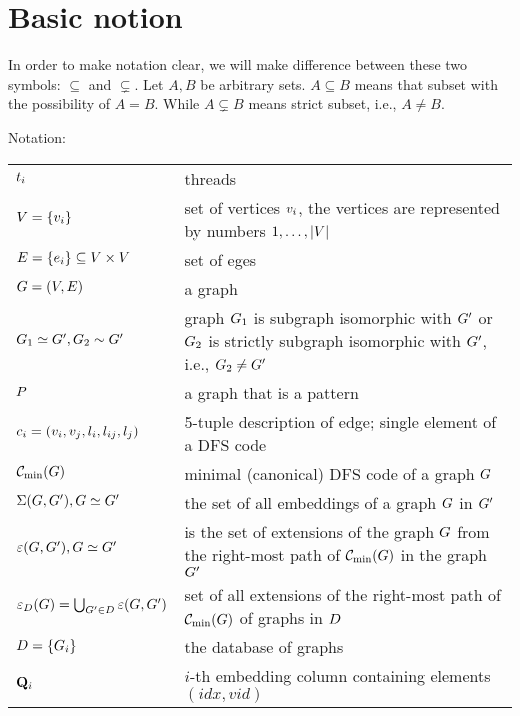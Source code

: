 \section{Basic notion}
In order to make notation clear, we will make difference between these
two symbols: $\subseteq$ and $\subsetneq$. Let $A,B$ be arbitrary
sets. $A\subseteq B$ means that subset with the possibility of $A=B$.
While $A\subsetneq B$ means strict subset, i.e., $A\neq B$.

\bigskip

\noindent Notation:\par
\begin{tabular}{lp{13cm}}
$t_i$                     &  threads                  \\ 
$V=\{v_i\}$                     & set of vertices $v_i$, the vertices are represented by numbers $1, \ldots, |V|$  \\
$E=\{e_i\}\subseteq V\times V$          & set of eges     \\
$G=(V, E)$                       & a graph                   \\
$G_1\simeq G', G_2\sim G'$               & graph $G_1$ is subgraph isomorphic with $G'$ or $G_2$ is strictly subgraph isomorphic with $G'$, i.e., $G_2\neq G'$  \\
$P$                       & a graph that is a pattern \\
$c_i=(v_i, v_j, l_i, l_{ij}, l_j)$  &  5-tuple description of edge; single element of a DFS code \\
$\mindfscode(\G)$                       & minimal (canonical) DFS code of a graph $G$ \\
$\Sigma(G,G'), G\simeq G'$    & the set of all embeddings of a graph $G$ in $G'$ \\
$\varepsilon(G,G'), G\simeq G'$     & is the set of extensions of the graph $G$ from the right-most path of $\mindfscode(\G)$ in the graph $G'$\\
$\varepsilon_{D}(G)=\bigcup_{G'\in D}\varepsilon(G, G')$       & set of all extensions of the right-most path of $\mindfscode(\G)$ of graphs in $D$ \\
$D=\{G_i\}$           & the database of graphs \\
$\mathbf{Q}_i$            & $i$-th embedding column containing elements $(idx,vid)$ \\

\end{tabular}
